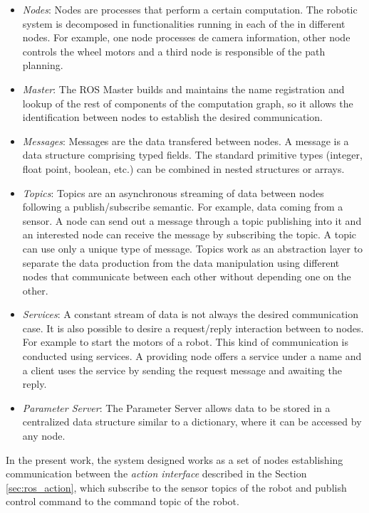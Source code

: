 \begin{itemize}
	\item \emph{Nodes}: Nodes are processes that perform a certain computation. The robotic system is decomposed in functionalities running in each of the in different nodes. For example, one node processes de camera information, other node controls the wheel motors and a third node is responsible of the path planning.
	
	\item \emph{Master}: The ROS Master builds and maintains the name registration and lookup of the rest of components of the computation graph, so it allows the identification between nodes to establish the desired communication.
	
	\item \emph{Messages}: Messages are the data transfered between nodes. A message is a data structure comprising typed fields. The standard primitive types (integer, float point, boolean, etc.) can be combined in nested structures or arrays.
	
	\item \emph{Topics}: Topics are an asynchronous streaming of data between nodes following a publish/subscribe semantic. For example, data coming from a sensor. A node can send out a message through a topic publishing into it and an interested node can receive the message by subscribing the topic. A topic can use only a unique type of message. Topics work as an abstraction layer to separate the data production from the data manipulation using different nodes that communicate between each other without depending one on the other.
	
	\item \emph{Services}: A constant stream of data is not always the desired communication case. It is also possible to desire a request/reply interaction between to nodes. For example to start the motors of a robot. This kind of communication is conducted using services. A providing node offers a service under a name and a client uses the service by sending the request message and awaiting the reply.
	
	\item \emph{Parameter Server}: The Parameter Server allows data to be stored in a centralized data structure similar to a dictionary, where it can be accessed by any node. 
\end{itemize}

In the present work, the system designed works as a set of nodes establishing communication between the \emph{action interface} described in the Section \ref{sec:ros_action}, which subscribe to the sensor topics of the robot and publish control command to the command topic of the robot.

